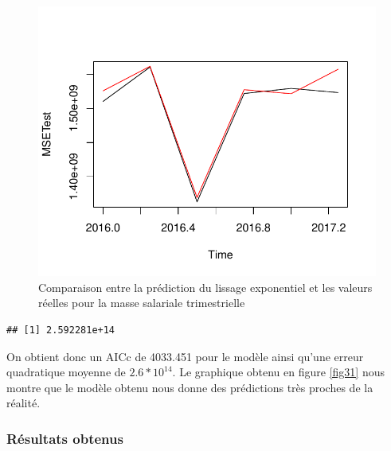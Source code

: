 \documentclass[11pt,]{article}
\begin{document}
\begin{figure}

{\centering \includegraphics{doc_files/figure-latex/unnamed-chunk-51-1} 

}

\caption{\label{fig31} Comparaison entre la prédiction du lissage exponentiel et les valeurs réelles pour la masse salariale trimestrielle}\label{fig:unnamed-chunk-51}
\end{figure}

\begin{verbatim}
## [1] 2.592281e+14
\end{verbatim}

On obtient donc un AICc de 4033.451 pour le modèle ainsi qu'une erreur
quadratique moyenne de \(2.6*10^{14}\). Le graphique obtenu en figure
\ref{fig31} nous montre que le modèle obtenu nous donne des prédictions
très proches de la réalité.

\subsubsection{Résultats obtenus}\label{resultats-obtenus}
\end{document}
